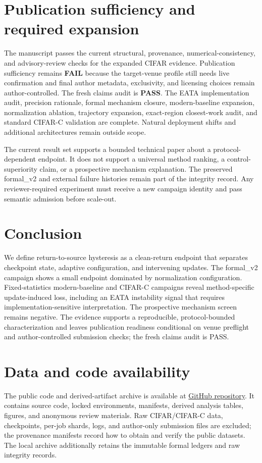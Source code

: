 \documentclass[11pt]{article}
\begin{document}
\section{Publication sufficiency and required expansion}
\label{sec:sufficiency}

The manuscript passes the current structural, provenance, numerical-consistency, and advisory-review checks for the expanded CIFAR evidence. Publication sufficiency remains \textbf{FAIL} because the target-venue profile still needs live confirmation and final author metadata, exclusivity, and licensing choices remain author-controlled. The fresh claims audit is \textbf{PASS}. The EATA implementation audit, precision rationale, formal mechanism closure, modern-baseline expansion, normalization ablation, trajectory expansion, exact-region closest-work audit, and standard CIFAR-C validation are complete. Natural deployment shifts and additional architectures remain outside scope.

The current result set supports a bounded technical paper about a protocol-dependent endpoint. It does not support a universal method ranking, a control-superiority claim, or a prospective mechanism explanation. The preserved formal\_v2 and external failure histories remain part of the integrity record. Any reviewer-required experiment must receive a new campaign identity and pass semantic admission before scale-out.

\section{Conclusion}
\label{sec:conclusion}

We define return-to-source hysteresis as a clean-return endpoint that separates checkpoint state, adaptive configuration, and intervening updates. The formal\_v2 campaign shows a small endpoint dominated by normalization configuration. Fixed-statistics modern-baseline and CIFAR-C campaigns reveal method-specific update-induced loss, including an EATA instability signal that requires implementation-sensitive interpretation. The prospective mechanism screen remains negative. The evidence supports a reproducible, protocol-bounded characterization and leaves publication readiness conditional on venue preflight and author-controlled submission checks; the fresh claims audit is PASS.

\section*{Data and code availability}
The public code and derived-artifact archive is available at \href{https://github.com/KaiserIIII/return-to-source-hysteresis}{GitHub repository}. It contains source code, locked environments, manifests, derived analysis tables, figures, and anonymous review materials. Raw CIFAR/CIFAR-C data, checkpoints, per-job shards, logs, and author-only submission files are excluded; the provenance manifests record how to obtain and verify the public datasets. The local archive additionally retains the immutable formal ledgers and raw integrity records.
\end{document}
